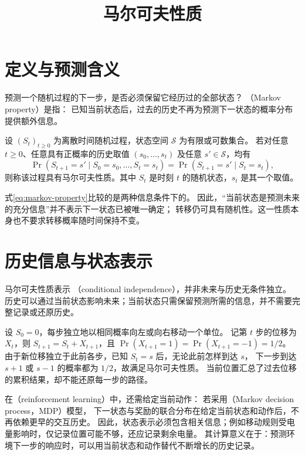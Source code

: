 \documentclass[UTF8]{ctexart}
\title{马尔可夫性质}
\author{}
\date{}
\begin{document}
\maketitle

\section{定义与预测含义}
\label{sec:markov-property-definition}

预测一个随机过程的下一步，是否必须保留它经历过的全部状态？
（Markov property）是指：
已知当前状态后，过去的历史不再为预测下一状态的概率分布提供额外信息。

\begin{definition}[离散状态下的马尔可夫性质]
设 $(S_t)_{t\geq 0}$ 为离散时间随机过程，状态空间 $\mathcal S$ 为有限或可数集合。
若对任意 $t\geq 0$、任意具有正概率的历史取值 $(s_0,\ldots,s_t)$ 及任意 $s'\in\mathcal S$，均有
\begin{equation}
  \Pr(S_{t+1}=s'\mid S_0=s_0,\ldots,S_t=s_t)
  =\Pr(S_{t+1}=s'\mid S_t=s_t),
  \label{eq:markov-property}
\end{equation}
则称该过程具有马尔可夫性质。其中 $S_t$ 是时刻 $t$ 的随机状态，$s_t$ 是其一个取值。
\end{definition}

式\eqref{eq:markov-property}比较的是两种信息条件下的。
因此，“当前状态是预测未来的充分信息”并不表示下一状态已被唯一确定；
转移仍可具有随机性。这一性质本身也不要求转移概率随时间保持不变。

\section{历史信息与状态表示}
\label{sec:markov-property-history}

马尔可夫性质表示
（conditional independence），并非未来与历史无条件独立。
历史可以通过当前状态影响未来；当前状态只需保留预测所需的信息，并不需要完整记录或还原历史。

\begin{example}[一维随机游走]
设 $S_0=0$，每步独立地以相同概率向左或向右移动一个单位。
记第 $t$ 步的位移为 $X_t$，则 $S_{t+1}=S_t+X_{t+1}$，且
$\Pr(X_{t+1}=1)=\Pr(X_{t+1}=-1)=1/2$。
由于新位移独立于此前各步，已知 $S_t=s$ 后，无论此前怎样到达 $s$，
下一步到达 $s+1$ 或 $s-1$ 的概率都为 $1/2$，故满足马尔可夫性质。
当前位置汇总了过去位移的累积结果，却不能还原每一步的路径。
\end{example}

在（reinforcement learning）中，还需给定当前动作：
若采用（Markov decision process，MDP）模型，
下一状态与奖励的联合分布在给定当前状态和动作后，不再依赖更早的交互历史。
因此，状态表示必须包含相关信息；例如移动规则受电量影响时，仅记录位置可能不够，还应记录剩余电量。
其计算意义在于：预测环境下一步的响应时，可以用当前状态和动作替代不断增长的历史记录。
\end{document}
